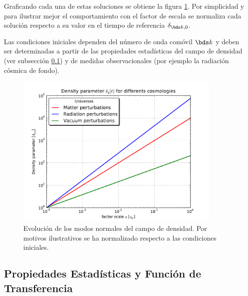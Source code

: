 Graficando cada una de estas soluciones se obtiene la figura 
\ref{fig:DeltaEvolution}. Por simplicidad y para ilustrar mejor el 
comportamiento con el factor de escala se normaliza cada solución respecto 
a su valor en el tiempo de referencia $\delta_{\bds k, 0}$. 


Las condiciones iniciales dependen del número de onda comóvil $\bds k$ y
deben ser determinadas a partir de las propiedades estadísticas del campo 
de densidad (ver subsección \ref{subsec:StatisticalProperties}) y de 
medidas observacionales (por ejemplo la radiación cósmica de fondo).

\newpage

\begin{figure}[htbp]
	\centering
	\includegraphics[width=0.9\textwidth]
	{./figures/2_theoretical_framework/Perturbations_Evolution.pdf}

	\caption{\small{Evolución de los modos normales del campo de densidad.
	Por motivos ilustrativos se ha normalizado respecto a las condiciones 
	iniciales.}}
	
	\label{fig:DeltaEvolution}
\end{figure}


	\subsection{Propiedades Estadísticas y Función de Transferencia}
	\label{subsec:StatisticalProperties}


